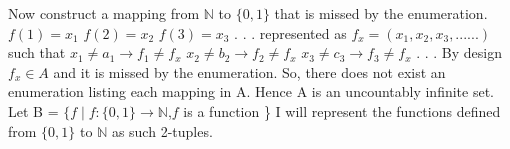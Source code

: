 \documentclass[11pt]{article}
\begin{document}
\noindent
Now construct a mapping from $\mathbb{N}$ to $\{0,1\}$ that is missed by the
enumeration.  \newline \newline
$f(1) = x_1$ \newline
$f(2) = x_2$ \newline
$f(3) = x_3$ \newline
. \newline
. \newline
. \newline
represented as $f_x = (x_1,x_2,x_3,......)$
\newline \newline such that \newline 
$x_1 \neq a_1 \rightarrow f_1 \neq f_x$ \newline
$x_2 \neq b_2 \rightarrow f_2 \neq f_x$ \newline
$x_3 \neq c_3 \rightarrow f_3 \neq f_x$ \newline
. \newline
. \newline
. \newline \newline
By design $f_x \in A$ and it is missed by the enumeration. So, there does not exist an enumeration listing each mapping in A. Hence A is an uncountably infinite set. 
\newpage
\noindent
Let B = $\{f \mid f:\{0,1\} \xrightarrow{} \mathbb{N}$,$f$ is a function \}
\newline \newline
I will represent the functions defined from $\{0,1\}$ to $\mathbb{N}$ as such 2-tuples.
\end{document}
